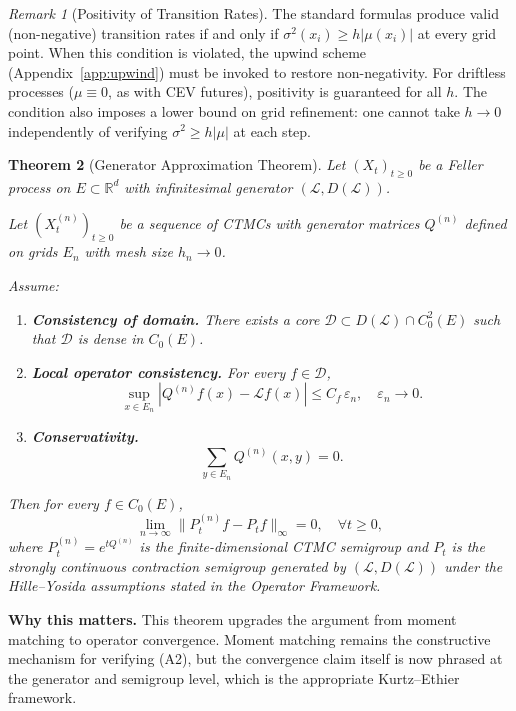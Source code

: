 \documentclass[11pt,a4paper,openany]{book}
\theoremstyle{definition}
\theoremstyle{plain}
\newtheorem{theorem}{Theorem}[chapter]
\theoremstyle{remark}
\newtheorem{remark}[theorem]{Remark}
\newcommand{\1}{\mathbbm{1}}
\begin{document}
\begin{remark}[Positivity of Transition Rates]
The standard formulas produce valid (non-negative) transition rates if and only if $\sigma^{2}(x_{i}) \geq h |\mu(x_{i})|$ at every grid point. When this condition is violated, the upwind scheme (Appendix~\ref{app:upwind}) must be invoked to restore non-negativity. For driftless processes ($\mu \equiv 0$, as with CEV futures), positivity is guaranteed for all $h$. The condition also imposes a lower bound on grid refinement: one cannot take $h \to 0$ independently of verifying $\sigma^{2} \geq h|\mu|$ at each step.
\end{remark}

\begin{theorem}[Generator Approximation Theorem]
\label{thm:generator-approximation}
Let $(X_t)_{t\ge 0}$ be a Feller process on $E \subset \mathbb{R}^d$ with infinitesimal generator $(\mathcal{L}, D(\mathcal{L}))$.

Let $(X^{(n)}_t)_{t\ge 0}$ be a sequence of CTMCs with generator matrices $Q^{(n)}$ defined on grids $E_n$ with mesh size $h_n \to 0$.

Assume:
\begin{enumerate}[label=(A\arabic*)]
    \item \textbf{Consistency of domain.} There exists a core $\mathcal{D} \subset D(\mathcal{L}) \cap C_0^2(E)$ such that $\mathcal{D}$ is dense in $C_0(E)$.
    \item \textbf{Local operator consistency.} For every $f \in \mathcal{D}$,
    \[
    \sup_{x \in E_n} \left| Q^{(n)} f(x) - \mathcal{L} f(x) \right| \le C_f \, \varepsilon_n, \quad \varepsilon_n \to 0.
    \]
    \item \textbf{Conservativity.}
    \[
    \sum_{y \in E_n} Q^{(n)}(x,y) = 0.
    \]
\end{enumerate}
Then for every $f \in C_0(E)$,
\[
\lim_{n \to \infty} \| P^{(n)}_t f - P_t f \|_\infty = 0, \quad \forall t \ge 0,
\]
where $P_t^{(n)} = e^{tQ^{(n)}}$ is the finite-dimensional CTMC semigroup and $P_t$ is the strongly continuous contraction semigroup generated by $(\mathcal{L},D(\mathcal{L}))$ under the Hille--Yosida assumptions stated in the Operator Framework.
\end{theorem}

\medskip
\noindent\textbf{Why this matters.} This theorem upgrades the argument from moment matching to operator convergence. Moment matching remains the constructive mechanism for verifying (A2), but the convergence claim itself is now phrased at the generator and semigroup level, which is the appropriate Kurtz--Ethier framework.
\end{document}
